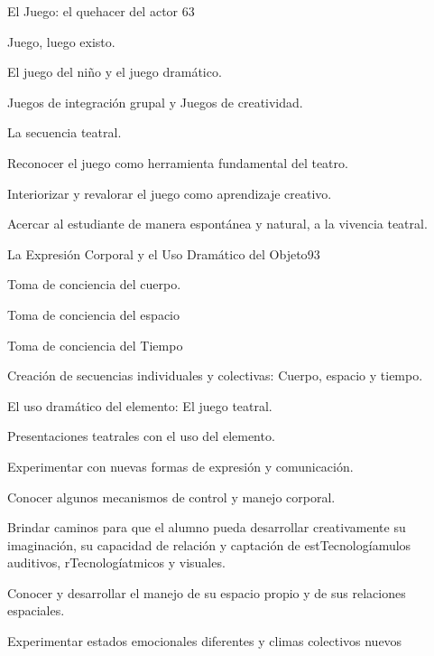 \begin{syllabus}
\begin{unit}{El Juego: el  quehacer del actor }{}{6}{3}
\begin{topics}
	\item Juego, luego existo.
	\item El juego del niño y el juego dramático.
	\item Juegos de integración grupal y Juegos de creatividad.
	\item La secuencia teatral.
\end{topics}
\begin{learningoutcomes}
	\item Reconocer el juego como herramienta fundamental del teatro.
	\item Interiorizar y revalorar el juego como aprendizaje creativo.
	\item Acercar al estudiante de manera espontánea y natural, a la vivencia teatral.
\end{learningoutcomes}
\end{unit}

\begin{unit}{La Expresión Corporal y el Uso Dramático del Objeto}{}{9}{3}
\begin{topics}
	\item Toma de conciencia del cuerpo.
	\item Toma de conciencia del espacio
	\item Toma de conciencia del Tiempo
	\item Creación de secuencias individuales y colectivas: Cuerpo, espacio y tiempo.
	\item El uso dramático del elemento: El juego teatral.
	\item Presentaciones teatrales con el uso del elemento.

\end{topics}
\begin{learningoutcomes}
	\item Experimentar con nuevas formas de expresión y comunicación.
	\item Conocer algunos mecanismos de control y manejo corporal.
	\item Brindar caminos para que el alumno pueda desarrollar creativamente su imaginación, su capacidad de relación  y captación de estTecnologíamulos auditivos, rTecnologíatmicos y visuales.
	\item Conocer y desarrollar el manejo de su espacio propio  y de sus  relaciones  espaciales.
	\item Experimentar  estados emocionales diferentes y climas  colectivos nuevos
\end{learningoutcomes}
\end{unit}


\end{syllabus}
